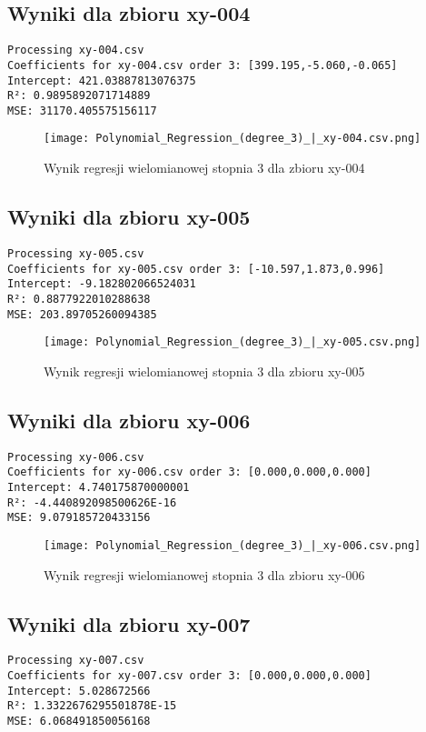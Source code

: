 \documentclass{article}
\begin{document}
\subsection{Wyniki dla zbioru xy-004}
\begin{verbatim}
Processing xy-004.csv
Coefficients for xy-004.csv order 3: [399.195,-5.060,-0.065]
Intercept: 421.03887813076375
R²: 0.9895892071714889
MSE: 31170.405575156117
\end{verbatim}

\begin{figure}[H]
    \centering
    \texttt{[image: Polynomial\_Regression\_(degree\_3)\_|\_xy-004.csv.png]}
    \caption{Wynik regresji wielomianowej stopnia 3 dla zbioru xy-004}
\end{figure}

\subsection{Wyniki dla zbioru xy-005}
\begin{verbatim}
Processing xy-005.csv
Coefficients for xy-005.csv order 3: [-10.597,1.873,0.996]
Intercept: -9.182802066524031
R²: 0.8877922010288638
MSE: 203.89705260094385
\end{verbatim}

\begin{figure}[H]
    \centering
    \texttt{[image: Polynomial\_Regression\_(degree\_3)\_|\_xy-005.csv.png]}
    \caption{Wynik regresji wielomianowej stopnia 3 dla zbioru xy-005}
\end{figure}

\subsection{Wyniki dla zbioru xy-006}
\begin{verbatim}
Processing xy-006.csv
Coefficients for xy-006.csv order 3: [0.000,0.000,0.000]
Intercept: 4.740175870000001
R²: -4.440892098500626E-16
MSE: 9.079185720433156
\end{verbatim}

\begin{figure}[H]
    \centering
    \texttt{[image: Polynomial\_Regression\_(degree\_3)\_|\_xy-006.csv.png]}
    \caption{Wynik regresji wielomianowej stopnia 3 dla zbioru xy-006}
\end{figure}

\subsection{Wyniki dla zbioru xy-007}
\begin{verbatim}
Processing xy-007.csv
Coefficients for xy-007.csv order 3: [0.000,0.000,0.000]
Intercept: 5.028672566
R²: 1.3322676295501878E-15
MSE: 6.068491850056168
\end{verbatim}
\end{document}
